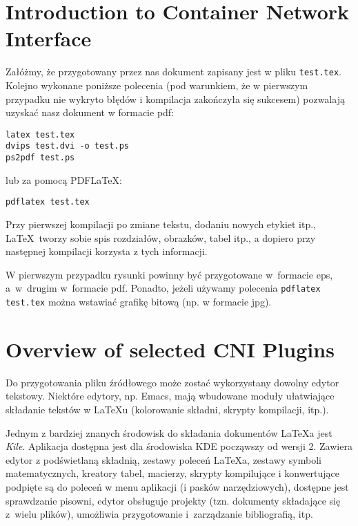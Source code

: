 
\section{Introduction to Container Network Interface}
\label{sec:cni_intro}


Załóżmy, że przygotowany przez nas dokument zapisany jest w pliku \texttt{test.tex}. Kolejno wykonane poniższe polecenia (pod warunkiem, że w pierwszym przypadku nie wykryto błędów i kompilacja zakończyła się sukcesem) pozwalają uzyskać nasz dokument w formacie pdf:
\begin{lstlisting}
latex test.tex
dvips test.dvi -o test.ps
ps2pdf test.ps
\end{lstlisting}
%
lub za pomocą PDF\LaTeX:
\begin{lstlisting}
pdflatex test.tex
\end{lstlisting}

Przy pierwszej kompilacji po zmiane tekstu, dodaniu nowych etykiet itp., \LaTeX~tworzy sobie spis rozdziałów, obrazków, tabel itp., a dopiero przy następnej kompilacji korzysta z tych informacji.

W pierwszym przypadku rysunki powinny być przygotowane w~formacie eps, a~w~drugim w~formacie pdf. Ponadto, jeżeli używamy polecenia \texttt{pdflatex test.tex} można wstawiać grafikę bitową (np. w formacie jpg).




\section{Overview of selected CNI Plugins}
\label{sec:cni_overview}


Do przygotowania pliku źródłowego może zostać wykorzystany dowolny edytor tekstowy. Niektóre edytory, np. Emacs, mają wbudowane moduły ułatwiające składanie tekstów w LaTeXu (kolorowanie składni, skrypty kompilacji, itp.).

Jednym z bardziej znanych środowisk do składania dokumentów  \LaTeX a jest {\em Kile}. Aplikacja dostępna jest dla środowiska KDE począwszy od wersji 2. Zawiera edytor z podświetlaną składnią, zestawy poleceń \LaTeX a, zestawy symboli matematycznych, kreatory tabel, macierzy, skrypty kompilujące i konwertujące podpięte są do poleceń w menu aplikacji (i pasków narzędziowych), dostępne jest sprawdzanie pisowni, edytor obsługuje projekty (tzn. dokumenty składające się z~wielu plików), umożliwia przygotowanie i~zarządzanie bibliografią, itp.

